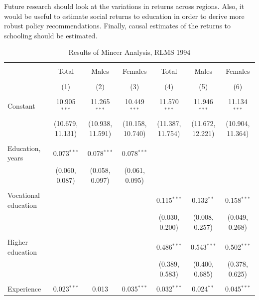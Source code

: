 \documentclass[alpha-refs]{wiley-article-01g}
\begin{document}
Future research should look at the variations in returns across regions.  Also, it would be useful to estimate social returns to education in order to derive more robust policy recommendations. Finally, causal estimates of the returns to schooling should be estimated.


\printbibliography

\newpage

\pagestyle{empty}
\begin{landscape}


\fontsize{9}{11}
\selectfont

\begin{table}[!htbp] \centering 
\renewcommand{\arraystretch}{1.0}
  \caption{Results of Mincer Analysis, RLMS 1994} 
  \label{} 
\begin{tabular}{@{\extracolsep{5pt}}lcccccc} 
\\[-1.8ex]\hline 
\hline \\[-1.8ex] 
 & Total & Males & Females & Total & Males & Females \\ 
\\[-1.8ex] & (1) & (2) & (3) & (4) & (5) & (6)\\ 
\hline \\[-1.8ex] 
 Constant & 10.905$^{***}$ & 11.265$^{***}$ & 10.449$^{***}$ & 11.570$^{***}$ & 11.946$^{***}$ & 11.134$^{***}$ \\ 
  & (10.679, 11.131) & (10.938, 11.591) & (10.158, 10.740) & (11.387, 11.754) & (11.672, 12.221) & (10.904, 11.364) \\ 
  & & & & & & \\ 
 Education, years & 0.073$^{***}$ & 0.078$^{***}$ & 0.078$^{***}$ &  &  &  \\ 
  & (0.060, 0.087) & (0.058, 0.097) & (0.061, 0.095) &  &  &  \\ 
  & & & & & & \\ 
 Vocational education &  &  &  & 0.115$^{***}$ & 0.132$^{**}$ & 0.158$^{***}$ \\ 
  &  &  &  & (0.030, 0.200) & (0.008, 0.257) & (0.049, 0.268) \\ 
  & & & & & & \\ 
 Higher education &  &  &  & 0.486$^{***}$ & 0.543$^{***}$ & 0.502$^{***}$ \\ 
  &  &  &  & (0.389, 0.583) & (0.400, 0.685) & (0.378, 0.625) \\ 
  & & & & & & \\ 
 Experience & 0.023$^{***}$ & 0.013 & 0.035$^{***}$ & 0.032$^{***}$ & 0.024$^{**}$ & 0.045$^{***}$ \\ 

\end{tabular}
\end{table}
\end{landscape}
\end{document}
